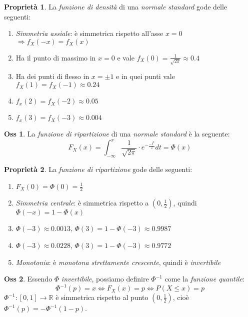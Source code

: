 \documentclass[12pt, a4paper]{report}
\theoremstyle{definition}
\newtheorem*{observation}{Oss}
\newtheorem*{property}{Proprietà}
\DeclareRobustCommand{\R}{\mathbb{R}}%
\begin{document}
\begin{property}
	La \emph{funzione di densità} di una \emph{normale standard} gode delle seguenti:
	\begin{enumerate}[label=(\roman*)]
		\item \emph{Simmetria assiale}: è simmetrica rispetto all'asse $x=0$
		\(\Rightarrow f_X(-x)=f_X(x)\)
		\item Ha il punto di massimo in $x=0$ e vale \(f_X(0)=\frac{1}{\sqrt{2\pi}}
		\approx0.4\)
		\item Ha dei punti di flesso in $x=\pm 1$ e in quei punti vale \(f_X(1)=
		f_X(-1)\approx0.24\)
		\item \(f_x(2)=f_X(-2)\approx0.05\)
		\item \(f_x(3)=f_X(-3)\approx0.004\)
	\end{enumerate}
\end{property}

\begin{observation}
	La \emph{funzione di ripartizione} di una \emph{normale standard} è la seguente:
	\[F_X(x)=\int_{-\infty}^x \frac{1}{\sqrt{2\pi}}\cdot e^{-\frac{-t^2}{2}}dt=\Phi(x)\]
\end{observation}

\begin{property}
	La \emph{funzione di ripartizione} gode delle seguenti:
	\begin{enumerate}[label=(\roman*)]
		\item \(F_X(0)=\Phi(0)=\frac{1}{2}\)
		\item \emph{Simmetria centrale}: è simmetrica rispetto a \((0,\frac{1}{2})\),
		quindi \(\Phi(-x)=1-\Phi(x)\)
		\item \(\Phi(-3)\approx0.0013\), \(\Phi(3)=1-\Phi(-3)\approx0.9987\)
		\item \(\Phi(-3)\approx0.0228\), \(\Phi(3)=1-\Phi(-3)\approx0.9772\)
		\item \emph{Monotonia}: è \emph{monotona strettamente crescente}, quindi
		è \emph{invertibile}
	\end{enumerate}
\end{property}

\begin{observation}
	Essendo $\Phi$ \emph{invertibile}, possiamo definire $\Phi^{-1}$ come la
	\emph{funzione quantile}:
	\[\Phi^{-1}(p)=x\Leftrightarrow F_X(x)=p\Leftrightarrow P(X\leq x)=p\]
	\(\Phi^{-1}:[0,1]\to\R\) è simmetrica rispetto al punto $(0,\frac{1}{2})$, cioè
	\(\Phi^{-1}(p)=-\Phi^{-1}(1-p)\).
\end{observation}
\end{document}
